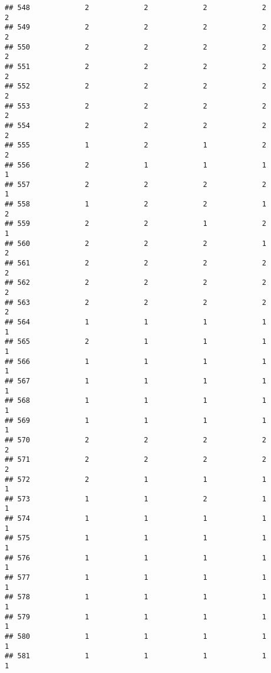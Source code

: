 \documentclass[
]{article}
\begin{document}
\begin{verbatim}
## 548             2             2             2             2             2
## 549             2             2             2             2             2
## 550             2             2             2             2             2
## 551             2             2             2             2             2
## 552             2             2             2             2             2
## 553             2             2             2             2             2
## 554             2             2             2             2             2
## 555             1             2             1             2             2
## 556             2             1             1             1             1
## 557             2             2             2             2             1
## 558             1             2             2             1             2
## 559             2             2             1             2             1
## 560             2             2             2             1             2
## 561             2             2             2             2             2
## 562             2             2             2             2             2
## 563             2             2             2             2             2
## 564             1             1             1             1             1
## 565             2             1             1             1             1
## 566             1             1             1             1             1
## 567             1             1             1             1             1
## 568             1             1             1             1             1
## 569             1             1             1             1             1
## 570             2             2             2             2             2
## 571             2             2             2             2             2
## 572             2             1             1             1             1
## 573             1             1             2             1             1
## 574             1             1             1             1             1
## 575             1             1             1             1             1
## 576             1             1             1             1             1
## 577             1             1             1             1             1
## 578             1             1             1             1             1
## 579             1             1             1             1             1
## 580             1             1             1             1             1
## 581             1             1             1             1             1

\end{verbatim}
\end{document}
